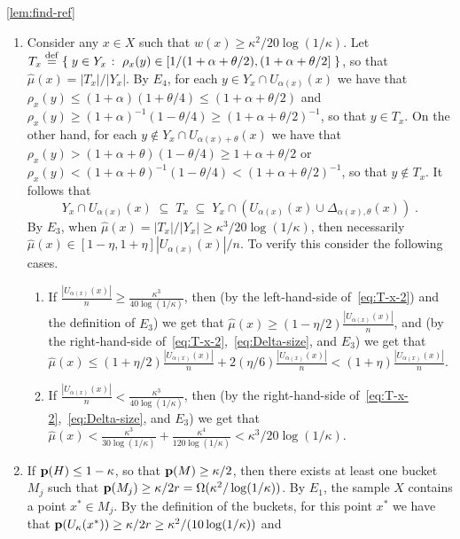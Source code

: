 \begin{proofof}{\cref{lem:find-ref}}
\begin{enumerate}
\item Consider any $x\in X$ such that
$\hat{w}(x) \geq \kappa^2/20\log(1/\kappa)$.
Let $T_x \stackrel{\rm def}{=} \left\{\; y\in Y_x  \;\colon\;  \rho_x(y) \in [1/(1+\alpha+\theta/2),(1+\alpha+\theta/2]\; \right\}$,
so that $\hat{\mu}(x) = |T_x|/|Y_x|$. By $E_4$,
for each $y \in Y_x\cap U_{\alpha(x)}(x)$ we have that
$\rho_x(y) \leq (1+\alpha)(1+\theta/4) \leq (1+\alpha+\theta/2)$
and $\rho_x(y) \geq (1+\alpha)^{-1}(1-\theta/4) \geq (1+\alpha+\theta/2)^{-1}$,
so that $y \in T_x$. On the other hand, for each
$y \notin Y_x \cap U_{\alpha(x)+\theta}(x)$ we have that
$\rho_x(y) > (1+\alpha+\theta)(1-\theta/4) \geq 1+\alpha+\theta/2$
or $\rho_x(y) < (1+\alpha+\theta)^{-1}(1-\theta/4) < (1+\alpha+\theta/2)^{-1}$,
so that $y \notin T_x$. It follows that
\begin{equation}\label{eq:T-x-2}
  Y_x \cap U_{\alpha(x)}(x) \;\subseteq\; T_x \;\subseteq\;
      Y_x \cap (U_{\alpha(x)}(x) \cup \Delta_{\alpha(x),\theta}(x))\;.
\end{equation}
By $E_3$, when $\hat{\mu}(x) = |T_x|/|Y_x| \geq \kappa^3/20\log(1/\kappa)$,
then necessarily $\hat{\mu}(x) \in [1-\eta,1+\eta]|U_{\alpha(x)}(x)|/n$.
To verify this consider the following cases.
  \begin{enumerate}
  \item If $\frac{|U_{\alpha(x)}(x)|}{n}\geq \frac{\kappa^3}{40\log(1/\kappa)}$,
  then (by the left-hand-side of~\cref{eq:T-x-2}) and the definition of $E_3$) we get that
  $\hat{\mu}(x) \geq (1-\eta/2)\frac{|U_{\alpha(x)}(x)|}{n}$, and
  (by the right-hand-side of~\cref{eq:T-x-2},~\cref{eq:Delta-size}, and $E_3$) we get that
  $\hat{\mu}(x) \leq (1+ \eta/2)\frac{|U_{\alpha(x)}(x)|}{n}
    + 2(\eta/6)\frac{|U_{\alpha(x)}(x)|}{n} < (1+\eta)\frac{|U_{\alpha(x)}(x)|}{n}$.
  \item If $\frac{|U_{\alpha(x)}(x)|}{n}< \frac{\kappa^3}{40\log(1/\kappa)}$,
  then (by the right-hand-side of~\cref{eq:T-x-2},~\cref{eq:Delta-size}, and $E_3$)
  we get that
  $\hat{\mu}(x) < \frac{\kappa^3}{30\log(1/\kappa)}
      + \frac{\kappa^4}{120\log(1/\kappa)} <  \kappa^3/20\log(1/\kappa)$.
  \end{enumerate}
\item If $\mathbf{p}(H) \leq 1-\kappa$, so that $\mathbf{p}(M) \geq \kappa/2$,
then there exists at least one bucket $M_j$ such that
$\mathbf{p}(M_j) \geq \kappa/2r = \Omega(\kappa^2/\log(1/\kappa))$.
By $E_1$, the sample $X$ contains a point $x^\ast\in M_j$.
By the definition of the buckets, for this point $x^\ast$ we have that
$\mathbf{p}(U_\kappa(x^\ast)) \geq \kappa/2r \geq \kappa^2/(10\log(1/\kappa))$ and

\end{enumerate}
\end{proofof}
